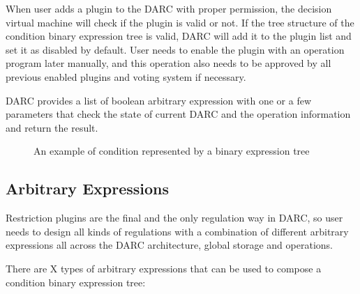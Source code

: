\documentclass[main.tex]{subfiles}
\begin{document}
When user adds a plugin to the DARC with proper permission, the decision virtual machine will check if the plugin is valid or not. If the tree structure of the condition binary expression tree is valid, DARC will add it to the plugin list and set it as disabled by default. User needs to enable the plugin with an operation program later manually, and this operation also needs to be approved by all previous enabled plugins and voting system if necessary.

DARC provides a list of boolean arbitrary expression with one or a few parameters that check the state of current DARC and the operation information and return the result. 


\begin{figure}
    \centering
{}
    \caption{An example of condition represented by a binary expression tree}
    \label{fig:my_label}
\end{figure}


\subsection{Arbitrary Expressions}

Restriction plugins are the final and the only regulation way in DARC, so user needs to design all kinds of regulations with a combination of different arbitrary expressions all across the DARC architecture, global storage and operations. 

There are X types of arbitrary expressions that can be used to compose a condition binary expression tree:
\end{document}
